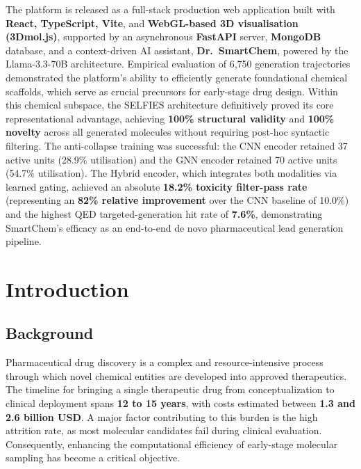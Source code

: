 \documentclass[12pt,a4paper]{report}
\begin{document}
The platform is released as a full-stack production web application built with \textbf{React, TypeScript, Vite}, and \textbf{WebGL-based 3D visualisation (3Dmol.js)}, supported by an asynchronous \textbf{FastAPI} server, \textbf{MongoDB} database, and a context-driven AI assistant, \textbf{Dr.\ SmartChem}, powered by the Llama-3.3-70B architecture. Empirical evaluation of 6{,}750 generation trajectories demonstrated the platform's ability to efficiently generate foundational chemical scaffolds, which serve as crucial precursors for early-stage drug design. Within this chemical subspace, the SELFIES architecture definitively proved its core representational advantage, achieving \textbf{100\% structural validity} and \textbf{100\% novelty} across all generated molecules without requiring post-hoc syntactic filtering. The anti-collapse training was successful: the CNN encoder retained 37 active units (28.9\% utilisation) and the GNN encoder retained 70 active units (54.7\% utilisation). The Hybrid encoder, which integrates both modalities via learned gating, achieved an absolute \textbf{18.2\% toxicity filter-pass rate} (representing an \textbf{82\% relative improvement} over the CNN baseline of 10.0\%) and the highest QED targeted-generation hit rate of \textbf{7.6\%}, demonstrating SmartChem's efficacy as an end-to-end de novo pharmaceutical lead generation pipeline.


\tableofcontents
\listoffigures
\listoftables

\clearpage
{}
\setcounter{page}{1}

\chapter{Introduction}

\section{Background}

Pharmaceutical drug discovery is a complex and resource-intensive process through which novel chemical entities are developed into approved therapeutics. The timeline for bringing a single therapeutic drug from conceptualization to clinical deployment spans \textbf{12 to 15 years}, with costs estimated between \textbf{1.3 and 2.6 billion USD}. A major factor contributing to this burden is the high attrition rate, as most molecular candidates fail during clinical evaluation. Consequently, enhancing the computational efficiency of early-stage molecular sampling has become a critical objective.
\end{document}
